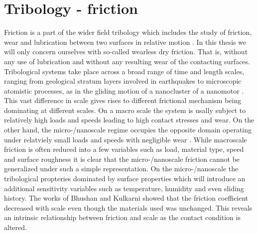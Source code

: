 





\chapter{Tribology - friction}
Friction is a part of the wider field tribology which includes the study of
friction, wear and lubrication between two surfaces in relative motion \cite[p.
1]{gnecco_meyer_2015}. In this thesis we will only concern ourselves with so-called wearless dry friction. That is, without any use of lubrication and without any resulting wear of the contacting surfaces. Tribological systems take place across a broad
range of time and length scales, ranging from geological stratum layers involved
in earthquakes \cite{kim_nano-scale_2009} to microscopic atomistic processes, as
in the gliding motion of a nanocluster of a nanomotor \cite{Manini_2016}. This
vast difference in scale gives rises to different frictional mechanism being
dominating at different scales. On a macro scale the system is usally subject
to relatively high loads and speeds leading to high contact stresses and
wear. On the other hand, the micro-/nanoscale regime occupies the opposite domain operating under relatviely small loads and speeds with negligible wear \cite{kim_nano-scale_2009} \cite[p. 5]{bhushan_2013}. While macroscale friction is often reduced into a few variables such as load, material type, speed and surface roughness it is clear that the micro-/nanoscale friction cannot be generalized under such a simple representation. On the micro-/nanoscale the tribological propteries dominated by surface properties which will introduce an additional sensitivity variables such as temperature, humidity and even sliding history. The works of Bhushan and Kulkarni \cite[(1996)]{BHUSHAN199649} showed that the friction coefficient decreased with scale even though the materials used was unchanged. This reveals an intrinsic relationship between friction and scale as the contact condition is altered.

